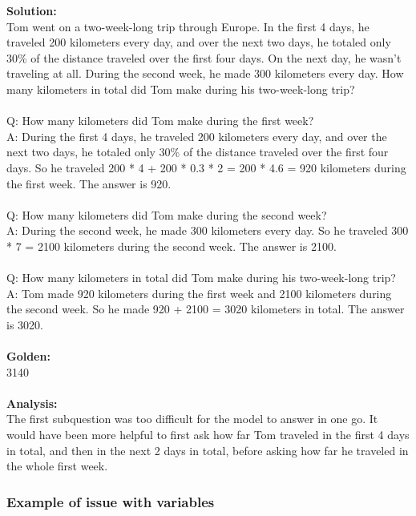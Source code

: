 \noindent
\textbf{Solution:} \\
Tom went on a two-week-long trip through Europe. In the first 4 days, he traveled 200 kilometers every day, and over the next two days, he totaled only 30\% of the distance traveled over the first four days. On the next day, he wasn't traveling at all. During the second week, he made 300 kilometers every day. How many kilometers in total did Tom make during his two-week-long trip? \\
 \\
Q: How many kilometers did Tom make during the first week? \\
A: During the first 4 days, he traveled 200 kilometers every day, and over the next two days, he totaled only 30\% of the distance traveled over the first four days. So he traveled 200 * 4 + 200 * 0.3 * 2 = 200 * 4.6 = 920 kilometers during the first week. The answer is 920. \\
 \\
Q: How many kilometers did Tom make during the second week? \\
A: During the second week, he made 300 kilometers every day. So he traveled 300 * 7 = 2100 kilometers during the second week. The answer is 2100. \\
 \\
Q: How many kilometers in total did Tom make during his two-week-long trip? \\
A: Tom made 920 kilometers during the first week and 2100 kilometers during the second week. So he made 920 + 2100 = 3020 kilometers in total. The answer is 3020. \\
 \\
\textbf{Golden:} \\
3140 \\
 \\
\textbf{Analysis:} \\
The first subquestion was too difficult for the model to answer in one go. It would have been more helpful to first ask how far Tom traveled in the first 4 days in total, and then in the next 2 days in total, before asking how far he traveled in the whole first week.

\subsubsection{Example of issue with variables}

